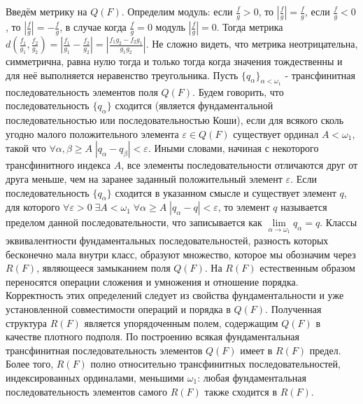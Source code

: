 \documentclass[12pt]{article}
\begin{document}
Введём метрику на $Q(F)$. Определим модуль: если $\frac{f}{g} > 0$, то $|\frac{f}{g}| = \frac{f}{g}$, если $\frac{f}{g} < 0$, то $|\frac{f}{g}| = -\frac{f}{g}$, в случае когда $\frac{f}{g} = 0$ модуль $|\frac{f}{g}| = 0$. Тогда метрика $d(\frac{f_1}{g_1}, \frac{f_2}{g_2}) = | \frac{f_1}{g_1} - \frac{f_2}{g_2} | = | \frac{f_1g_2 - f_2g_1}{g_1g_2} |$. Не сложно видеть, что метрика неотрицательна, симметрична, равна нулю тогда и только тогда когда значения тождественны и для неё выполняется неравенство треугольника. Пусть $\{ q_{\alpha} \}_{\alpha < \omega_1}$ - трансфинитная последовательность элементов поля $Q(F)$. Будем говорить, что последовательность $\{ q_{\alpha} \}$ сходится (является фундаментальной последовательностью или последовательностью Коши), если для всякого сколь угодно малого положительного элемента $\varepsilon \in Q(F)$ существует ординал $A < \omega_1$, такой что $\forall \alpha, \beta \geq A \; | q_{\alpha} - q_{\beta} | < \varepsilon$. Иными словами, начиная с некоторого трансфинитного индекса $A$, все элементы последовательности отличаются друг от друга меньше, чем на заранее заданный положительный элемент $\varepsilon$. Если последовательность $\{ q_{\alpha} \}$ сходится в указанном смысле и существует элемент $q$, для которого $\forall \varepsilon > 0 \; \exists A < \omega_1 \; \forall \alpha \geq A \; |q_{\alpha} - q| < \varepsilon$, то элемент $q$ называется пределом данной последовательности, что записывается как $\lim\limits_{\alpha \to \omega_1} q_{\alpha} = q$. Классы эквивалентности фундаментальных последовательностей, разность которых бесконечно мала внутри класс, образуют множество, которое мы обозначим через $R(F)$, являющееся замыканием поля $Q(F)$. На $R(F)$ естественным образом переносятся операции сложения и умножения и отношение порядка. Корректность этих определений следует из свойства фундаментальности и уже установленной совместимости операций и порядка в $Q(F)$. Полученная структура $R(F)$ является упорядоченным полем, содержащим $Q(F)$ в качестве плотного подполя. По построению всякая фундаментальная трансфинитная последовательность элементов $Q(F)$ имеет в $R(F)$ предел. Более того, $R(F)$ полно относительно трансфинитных последовательностей, индексированных ординалами, меньшими $\omega_1$: любая фундаментальная последовательность элементов самого $R(F)$ также сходится в $R(F)$.
\end{document}
